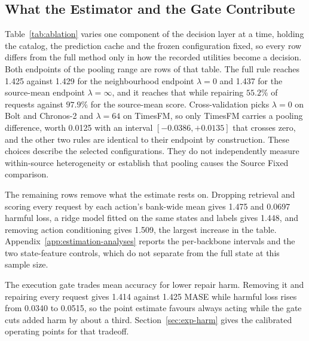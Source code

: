 \documentclass{article}
\begin{document}
\subsection{What the Estimator and the Gate Contribute}
\label{sec:exp-ablation}
Table~\ref{tab:ablation} varies one component of the decision layer at a time, holding the
catalog, the prediction cache and the frozen configuration fixed, so every row differs from
the full method only in how the recorded utilities become a decision. Both endpoints of the
pooling range are rows of that table. The full rule reaches 1.425 against 1.429 for the
neighbourhood endpoint $\lambda=0$ and 1.437 for the source-mean endpoint
$\lambda=\infty$, and it reaches that while repairing $55.2\%$ of requests against $97.9\%$
for the source-mean score. Cross-validation picks $\lambda=0$ on Bolt and Chronos-2 and
$\lambda=64$ on TimesFM, so only TimesFM carries a pooling difference, worth 0.0125 with an
interval $[-0.0386,+0.0135]$ that crosses zero, and the other two rules are identical to
their endpoint by construction. These choices describe the selected configurations. They do not independently measure
within-source heterogeneity or establish that pooling causes the Source Fixed comparison.

The remaining rows remove what the estimate rests on. Dropping retrieval and scoring every
request by each action's bank-wide mean gives 1.475 and 0.0697 harmful loss, a ridge model
fitted on the same states and labels gives 1.448, and removing action conditioning gives
1.509, the largest increase in the table. Appendix~\ref{app:estimation-analyses} reports the
per-backbone intervals and the two state-feature controls, which do not separate from the
full state at this sample size.

The execution gate trades mean accuracy for lower repair harm. Removing it and repairing
every request gives 1.414 against 1.425 MASE while harmful loss rises from 0.0340 to 0.0515,
so the point estimate favours always acting while the gate cuts added harm by about a third.
Section~\ref{sec:exp-harm} gives the calibrated operating points for that tradeoff.
\end{document}
